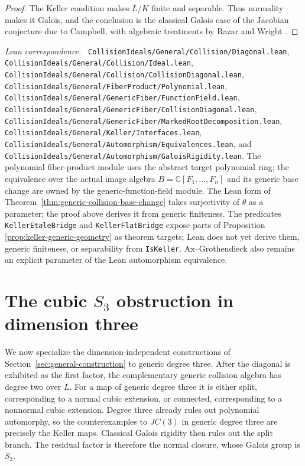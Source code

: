 \documentclass[11pt]{article}
\theoremstyle{remark}
\newcommand{\C}{\mathbb C}
\newcommand{\leanpath}[1]{\texttt{\nolinkurl{#1}}}
\newenvironment{leanfiles}
  {\par\medskip\begingroup\footnotesize\raggedright\noindent
   \textit{Lean correspondence.}\ }
  {\par\endgroup\medskip}
\begin{document}
\begin{proof}
The Keller condition makes \(L/K\) finite and separable.  Thus normality
makes it Galois, and the conclusion is the classical Galois case of the
Jacobian conjecture due to Campbell, with algebraic treatments by Razar
and Wright \cite{Campbell1973,Razar1979,Wright1981}.
\end{proof}

\begin{leanfiles}
\leanpath{CollisionIdeals/General/Collision/Diagonal.lean},
\leanpath{CollisionIdeals/General/Collision/Ideal.lean},
\leanpath{CollisionIdeals/General/Collision/CollisionDiagonal.lean},
\leanpath{CollisionIdeals/General/FiberProduct/Polynomial.lean},
\leanpath{CollisionIdeals/General/GenericFiber/FunctionField.lean},
\leanpath{CollisionIdeals/General/GenericFiber/CollisionDiagonal.lean},
\leanpath{CollisionIdeals/General/GenericFiber/MarkedRootDecomposition.lean},
\leanpath{CollisionIdeals/General/Keller/Interfaces.lean},
\leanpath{CollisionIdeals/General/Automorphism/Equivalences.lean}, and
\leanpath{CollisionIdeals/General/Automorphism/GaloisRigidity.lean}.
The polynomial fiber-product module uses the abstract target polynomial
ring; the equivalence over the actual image algebra
\(B=\C[F_1,\ldots,F_n]\) and its generic base change are owned by the
generic-function-field module.  The Lean form of
Theorem~\ref{thm:generic-collision-base-change} takes surjectivity of
\(\theta\) as a parameter; the proof above derives it from generic
finiteness.  The predicates \leanpath{KellerEtaleBridge} and
\leanpath{KellerFlatBridge} expose parts of Proposition
\ref{prop:keller-generic-geometry} as theorem targets; Lean does not yet
derive them, generic finiteness, or separability from \leanpath{IsKeller}.
Ax--Grothendieck also remains an explicit parameter of the Lean
automorphism equivalence.
\end{leanfiles}


\section{\texorpdfstring{The cubic \(S_3\) obstruction in dimension three}
  {The cubic S3 obstruction in dimension three}}
\label{sec:cubic-s3-obstruction}

We now specialize the dimension-independent constructions of
Section~\ref{sec:general-construction} to generic degree three.  After the
diagonal is exhibited as the first factor, the complementary
generic collision algebra has degree two over \(L\).  For a map of generic
degree three it is either split,
corresponding to a normal cubic extension, or connected, corresponding to
a nonnormal cubic extension.  Degree three already rules out polynomial
automorphy, so the counterexamples to \(JC(3)\) in generic degree three are
precisely the Keller maps.  Classical Galois rigidity then rules out the
split branch.  The residual factor is therefore the normal closure, whose
Galois group is \(S_3\).
\end{document}
